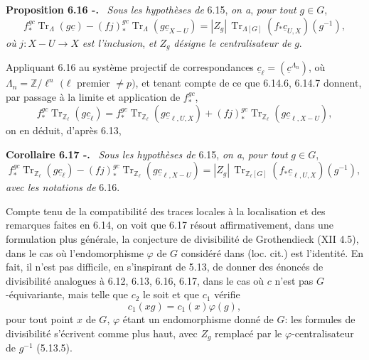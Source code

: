 \documentclass[11pt]{article}
\newenvironment{statement}[1]{\par\medskip\noindent\textbf{#1.}\ }{\par\medskip}
\providecommand{\Tr}{\operatorname{Tr}}
\providecommand{\Tr}{\operatorname{Tr}}
\providecommand{\Tr}{\operatorname{Tr}}
\providecommand{\Tr}{\operatorname{Tr}}
\providecommand{\Tr}{\operatorname{Tr}}
\begin{document}
\begin{statement}{Proposition 6.16 -}
\emph{Sous les hypothèses de} 6.15, \emph{on a}, \emph{pour tout} $g\in G$,
\begin{equation}
f_*^{gc}\Tr_{\Lambda}(g\underline c)
-(fj)_*^{gc}\Tr_{\Lambda}(g\underline c_{X-U})
=
|Z_g|\,\Tr_{\Lambda[G]}(f_*\underline c_{U,X})(g^{-1}),
\tag{6.16.1}
\end{equation}
\emph{où} $j:X-U\to X$ \emph{est l'inclusion}, \emph{et} $Z_g$ \emph{désigne le centralisateur de} $g$.
\end{statement}

Appliquant 6.16 au système projectif de correspondances $\underline c_{\ell}=(\underline c^{\Lambda_n})$, où $\Lambda_n=\mathbb Z/\ell^n$ $(\ell$ premier $\ne p)$, et tenant compte de ce que 6.14.6, 6.14.7 donnent, par passage à la limite et application de $f_*^{gc}$,
\[
f_*^{gc}\Tr_{\mathbb Z_{\ell}}(g\underline c_{\ell})
=
f_*^{gc}\Tr_{\mathbb Z_{\ell}}(g\underline c_{\ell,U,X})
+(fj)_*^{gc}\Tr_{\mathbb Z_{\ell}}(g\underline c_{\ell,X-U}),
\]
on en déduit, d'après 6.13,

\begin{statement}{Corollaire 6.17 -}
\emph{Sous les hypothèses de} 6.15, \emph{on a}, \emph{pour tout} $g\in G$,
\begin{equation}
f_*^{gc}\Tr_{\mathbb Z_{\ell}}(g\underline c_{\ell})
-(fj)_*^{gc}\Tr_{\mathbb Z_{\ell}}(g\underline c_{\ell,X-U})
=
|Z_g|\,\Tr_{\mathbb Z_{\ell}[G]}(f_*\underline c_{\ell,U,X})(g^{-1}),
\tag{6.17.1}
\end{equation}
\emph{avec les notations de} 6.16.
\end{statement}

Compte tenu de la compatibilité des traces locales à la localisation et des remarques faites en 6.14, on voit que 6.17 résout affirmativement, dans une formulation plus générale, la conjecture de divisibilité de Grothendieck (XII 4.5), dans le cas où l'endomorphisme $\varphi$ de $G$ considéré dans (loc. cit.) est l'identité.
En
fait, il n'est pas difficile, en s'inspirant de 5.13, de donner des énoncés de divisibilité analogues à 6.12, 6.13, 6.16, 6.17, dans le cas où $c$ n'est pas $G$-équivariante, mais telle que $c_2$ le soit et que $c_1$ vérifie
\[
c_1(xg)=c_1(x)\varphi(g),
\]
pour tout point $x$ de $G$, $\varphi$ étant un endomorphisme donné de $G$: les formules de divisibilité s'écrivent comme plus haut, avec $Z_g$ remplacé par le $\varphi$-centralisateur de $g^{-1}$ (5.13.5).
\end{document}
